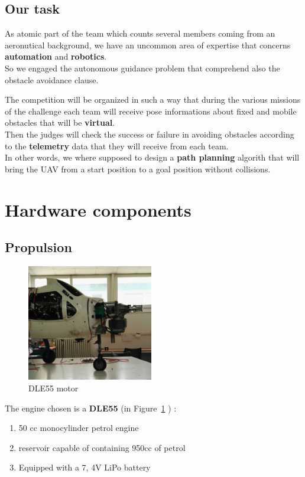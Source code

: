 \documentclass[oneside,onecolumn]{article}
\begin{document}
\subsection{Our task}
As atomic part of the team which counts several members coming from an
aeronutical background, we have an uncommon area of expertise that concerns
\textbf{automation} and \textbf{robotics}.\\ So we engaged the autonomous guidance problem that
comprehend also the obstacle avoidance clause.\par
The competition will be organized in such a way that during the various missions
of the challenge each team will receive pose informations about fixed and mobile
obstacles that will be \textbf{virtual}.\\
Then the judges will check the success or failure in avoiding obstacles
according to the \textbf{telemetry} data that they will receive from each team.\\
In other words, we where supposed to design a \textbf{path planning} algorith
that will bring the UAV from a start position to a goal position without collisions.




\section{Hardware components}

\subsection{Propulsion}
\begin{figure}
\caption{DLE55 motor}\label{wrap-fig:2}
\includegraphics[width=5.5cm]{YAK3}
\end{figure} 



The engine chosen is a \textbf{DLE55} (in Figure~\ref{wrap-fig:2} ) :

\begin{enumerate}
\item 50 cc monocylinder petrol engine
\item reservoir capable of containing 950cc of petrol
\item Equipped with a 7, 4V LiPo battery
\end{enumerate}
\end{document}
